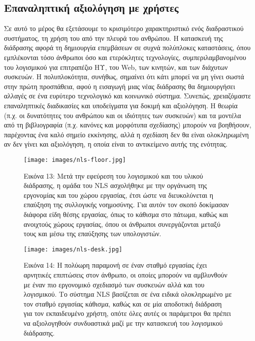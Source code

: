 \documentclass[
]{article}
\begin{document}
\hypertarget{ux3b5ux3c0ux3b1ux3bdux3b1ux3bbux3b7ux3c0ux3c4ux3b9ux3baux3ae-ux3b1ux3beux3b9ux3bfux3bbux3ccux3b3ux3b7ux3c3ux3b7-ux3bcux3b5-ux3c7ux3c1ux3aeux3c3ux3c4ux3b5ux3c2}{%
\subsection{Επαναληπτική αξιολόγηση με
χρήστες}\label{ux3b5ux3c0ux3b1ux3bdux3b1ux3bbux3b7ux3c0ux3c4ux3b9ux3baux3ae-ux3b1ux3beux3b9ux3bfux3bbux3ccux3b3ux3b7ux3c3ux3b7-ux3bcux3b5-ux3c7ux3c1ux3aeux3c3ux3c4ux3b5ux3c2}}

Σε αυτό το μέρος θα εξετάσουμε το κρισιμότερο χαρακτηριστικό ενός
διαδραστικού συστήματος, τη χρήση του από την πλευρά του ανθρώπου. Η
κατασκευή της διάδρασης αφορά τη δημιουργία επεμβάσεων σε συχνά
πολύπλοκες καταστάσεις, όπου εμπλέκονται τόσο άνθρωποι όσο και
ετερόκλητες τεχνολογίες, συμπεριλαμβανομένου του λογισμικού για
επιτραπέζιο ΗΥ, του Web, των κινητών, και των διάχυτων συσκευών. Η
πολυπλοκότητα, συνήθως, σημαίνει ότι κάτι μπορεί να μη γίνει σωστά στην
πρώτη προσπάθεια, αφού η εισαγωγή μιας νέας διάδρασης θα δημιουργήσει
αλλαγές σε ένα ευρύτερο τεχνολογικό και κοινωνικό σύστημα. Συνεπώς,
χρειαζόμαστε επαναληπτικές διαδικασίες και υποδείγματα για δοκιμή και
αξιολόγηση. Η θεωρία (π.χ. οι δυνατότητες του ανθρώπου και οι ιδιότητες
των συσκευών) και τα μοντέλα από τη βιβλιογραφία (π.χ. κανόνες και
μορφότυπα σχεδίασης) μπορούν να βοηθήσουν, παρέχοντας ένα καλό σημείο
εκκίνησης, αλλά η σχεδίαση δεν θα είναι ολοκληρωμένη αν δεν γίνει και
αξιολόγηση, η οποία είναι το αντικείμενο αυτής της ενότητας.

\leavevmode{}%
\begin{figure}
\hypertarget{fig:nls-floor}{%
\centering
\texttt{[image: images/nls-floor.jpg]}
\caption{Εικόνα 13: Μετά την εφεύρεση του λογισμικού και του υλικού
διάδρασης, η ομάδα του NLS ασχολήθηκε με την οργάνωση της εργονομίας και
του χώρου εργασίας, έτσι ώστε να διευκολύνεται η επαύξηση της συλλογικής
νοημοσύνης. Για αυτόν τον σκοπό δοκίμασαν διάφορα είδη θέσης εργασίας,
όπως το κάθισμα στο πάτωμα, καθώς και ανοιχτούς χώρους εργασίας, όπου οι
άνθρωποι συνεργάζονται μεταξύ τους και μέσω της επαύξησης των
υπολογιστών.}\label{fig:nls-floor}
}
\end{figure}

\leavevmode{}%
\begin{figure}
\hypertarget{fig:nls-desk}{%
\centering
\texttt{[image: images/nls-desk.jpg]}
\caption{Εικόνα 14: Η πολύωρη παραμονή σε έναν σταθμό εργασίας έχει
αρνητικές επιπτώσεις στον άνθρωπο, οι οποίες μπορούν να αμβλυνθούν με
έναν πιο εργονομικό σχεδιασμό των συσκευών αλλά και του λογισμικού. Το
σύστημα NLS βασίζεται σε ένα ειδικά ολοκληρωμένο με τον σταθμό εργασίας
κάθισμα, καθώς και σε μία αποδοτική διάδραση για τον εκπαιδευμένο
χρήστη, οπότε όλες αυτές οι παράμετροι θα πρέπει να αξιολογηθούν
συνδυαστικά μαζί με την κατασκευή του λογισμικού
διάδρασης.}\label{fig:nls-desk}
}
\end{figure}
\end{document}

